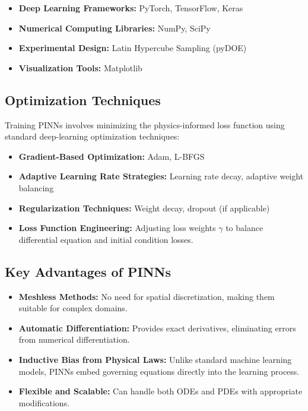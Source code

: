 \documentclass{article}
\begin{document}
\begin{itemize}
    \item \textbf{Deep Learning Frameworks:} PyTorch, TensorFlow, Keras
    \item \textbf{Numerical Computing Libraries:} NumPy, SciPy
    \item \textbf{Experimental Design:} Latin Hypercube Sampling (pyDOE)
    \item \textbf{Visualization Tools:} Matplotlib
\end{itemize}

\subsection{Optimization Techniques}
Training PINNs involves minimizing the physics-informed loss function using standard deep-learning optimization techniques:

\begin{itemize}
    \item \textbf{Gradient-Based Optimization:} Adam, L-BFGS
    \item \textbf{Adaptive Learning Rate Strategies:} Learning rate decay, adaptive weight balancing
    \item \textbf{Regularization Techniques:} Weight decay, dropout (if applicable)
    \item \textbf{Loss Function Engineering:} Adjusting loss weights $\gamma$ to balance differential equation and initial condition losses.
\end{itemize}

\subsection{Key Advantages of PINNs}
\begin{itemize}
    \item \textbf{Meshless Methods:} No need for spatial discretization, making them suitable for complex domains.
    \item \textbf{Automatic Differentiation:} Provides exact derivatives, eliminating errors from numerical differentiation.
    \item \textbf{Inductive Bias from Physical Laws:} Unlike standard machine learning models, PINNs embed governing equations directly into the learning process.
    \item \textbf{Flexible and Scalable:} Can handle both ODEs and PDEs with appropriate modifications.
\end{itemize}
\end{document}
